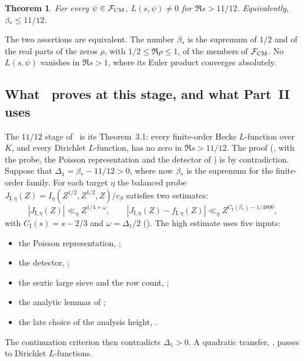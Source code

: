 \documentclass[11pt]{article}
\numberwithin{equation}{section}
\newtheorem{theorem}{Theorem}
\begin{document}
\begin{theorem}\label{thm:s6-1112}
For every $\psi\in\mathcal F_{\rm CM}$, $L(s,\psi)\ne0$ for $\Re s>11/12$. Equivalently, $\beta_*\le11/12$.
\end{theorem}

The two assertions are equivalent. The number $\beta_*$ is the supremum of $1/2$ and of the real parts of
the zeros $\rho$, with $1/2\le\Re\rho\le1$, of the members of $\mathcal F_{\rm CM}$. No $L(s,\psi)$ vanishes
in $\Re s>1$, where its Euler product converges absolutely.

\subsection{What~\texorpdfstring{\cite{OAI78}}{[OAI78]} proves at this stage, and what Part~II uses}
\label{subsec:s6-what}
The $11/12$ stage of~\cite{OAI78} is its Theorem~3.1: every finite-order
Hecke $L$-function over $K$, and every Dirichlet $L$-function, has no zero in $\Re s>11/12$. The proof
(\cite[Sections~10--11]{OAI78}, with the probe, the Poisson representation and the detector of \cite[Sections~6--9]{OAI78}) is by
contradiction. Suppose that $\Delta_1=\beta_*-11/12>0$, where now $\beta_*$ is the supremum for the
finite-order family. For each target $\eta$ the balanced probe
$J_{\mathrm I,\eta}(Z)=I_\eta(Z^{1/2},Z^{1/2},Z)/c_S$ satisfies two estimates:
\begin{equation}\label{eq:d190}
 |J_{\mathrm I,\eta}(Z)|\ll_\eta Z^{1/4+\omega},\qquad
 |J_{\mathrm I,\eta}(Z)-f_{\mathrm I,\eta}(Z)|\ll_\eta Z^{C_{\mathrm I}(\beta_*)-1/4800},
\end{equation}
with $C_{\mathrm I}(s)=s-2/3$ and $\omega=\Delta_1/2$ (\cite[Props.~6.3 and
11.2]{OAI78}). The high estimate uses five inputs:
\begin{itemize}
\item the Poisson representation, \cite[Lemma~7.1]{OAI78};
\item the detector, \cite[Section~8]{OAI78};
\item the sextic large sieve and the row count, \cite[Lemma~9.1 and
 Prop.~9.2]{OAI78};
\item the analytic lemmas of \cite[Section~10]{OAI78};
\item the late choice of the analysis height, \cite[Lemma~11.1]{OAI78}.
\end{itemize}
The continuation criterion \cite[Prop.~2.1]{OAI78} then contradicts
$\Delta_1>0$. A quadratic transfer, \cite[Prop.~11.3]{OAI78}, passes to
Dirichlet $L$-functions.
\end{document}
